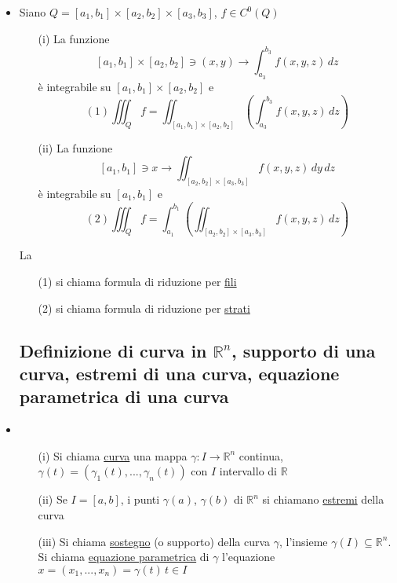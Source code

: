 \documentclass{report}
\newcommand{\ace}{\`e }
\newcommand{\Ins}[1]{\mathbb{#1}}
\newcommand{\R}{\Ins{R}}
\begin{document}
\begin{itemize}
  \subsection{Formula di integrazione per fili e per strati}
  \item Siano $Q = [a_1,b_1]\times [a_2,b_2]\times [a_3,b_3]$, $f \in C^0(Q)$
        \begin{enumerate}
          \item[(i)] La funzione $$[a_1,b_1]\times [a_2,b_2] \ni (x,y) \to \int_{a_3}^{b_3} f(x,y,z) \,dz$$
                    \ace integrabile su $[a_1,b_1]\times [a_2,b_2]$ e 
                    $$(1) \iiint_{Q} f = \iint_{[a_1,b_1]\times [a_2,b_2]} \left(\int_{a_3}^{b_3} f(x,y,z) \,dz\right)$$
          \item[(ii)] La funzione $$[a_1,b_1] \ni x \to \iint_{[a_2,b_2]\times [a_3,b_3]} f(x,y,z) \,dy\,dz$$
                      \ace integrabile su $[a_1,b_1]$ e 
                      $$(2) \iiint_{Q} f = \int_{a_1}^{b_1} \left(\iint_{[a_2,b_2]\times[a_3,b_3]} f(x,y,z) \,dz\right)$$
        \end{enumerate}
        La \begin{itemize}
          \item[(1)] si chiama formula di riduzione per \underline{fili}
          \item[(2)] si chiama formula di riduzione per \underline{strati}
        \end{itemize}

  \subsection{ Definizione di curva in $\R^n$, supporto di una curva, estremi di una curva, equazione parametrica di una curva}
  \item \begin{itemize}
          \item[(i)] Si chiama \underline{curva} una mappa $\gamma:I \to \R^n$ continua, 
                      $\gamma(t) = (\gamma_1(t),...,\gamma_n(t))$
                      con $I$ intervallo di $\R$
          \item[(ii)] Se $I = [a,b]$, i punti $\gamma(a)$, $\gamma(b)$ di $\R^n$ si chiamano
                      \underline{estremi} della curva
          \item[(iii)] Si chiama \underline{sostegno} (o supporto) della curva $\gamma$, l'insieme 
                        $\gamma(I) \subseteq \R^n$. Si chiama \underline{equazione parametrica} di $\gamma$ 
                        l'equazione $x = (x_1,...,x_n) = \gamma(t) \, t \in I$
        \end{itemize}


\end{itemize}
\end{document}

